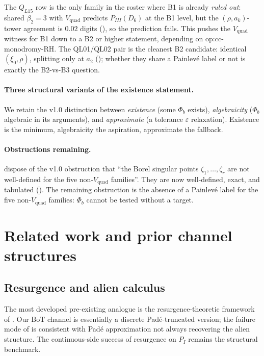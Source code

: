 \documentclass[11pt,reqno]{amsart}
\theoremstyle{plain}
\theoremstyle{definition}
\theoremstyle{remark}
\newcommand{\BoT}{\mathrm{BoT}}
\newcommand{\Vquad}{V_{\mathrm{quad}}}
\begin{document}
The $Q_{L15}$ row is the only family in the roster where B1
is already \emph{ruled out}: shared $\beta_2 = 3$ with
$\Vquad$ predicts $P_{III}(D_6)$ at the B1 level, but the
$(\rho, a_k)$-tower agreement is $0.02$ digits
(), so the prediction fails. This
pushes the $\Vquad$ witness for B1 down to a B2 or higher
statement, depending on \textsf{op:cc-monodromy-RH}. The
QL01/QL02 pair is the cleanest B2 candidate: identical
$(\xi_0, \rho)$, splitting only at $a_2$
(); whether they share a Painlev\'e label
or not is exactly the B2-vs-B3 question.

\paragraph{Three structural variants of the existence statement.}
We retain the v1.0 distinction between
\emph{existence} (some $\Phi_b$ exists),
\emph{algebraicity} ($\Phi_b$ algebraic in its arguments),
and \emph{approximate} (a tolerance $\varepsilon$ relaxation).
Existence is the minimum, algebraicity the aspiration,
approximate the fallback.

\paragraph{Obstructions remaining.}
 dispose of the v1.0
obstruction that ``the Borel singular points $\zeta_1, \ldots,
\zeta_r$ are not well-defined for the five non-$\Vquad$
families''. They are now well-defined, exact, and tabulated
(). The remaining obstruction is the
absence of a Painlev\'e label for the five non-$\Vquad$
families: $\Phi_b$ cannot be tested without a target.

\section{Related work and prior channel structures}
\label{sec:related}

\subsection{Resurgence and alien calculus}
The most developed pre-existing analogue is the
resurgence-theoretic framework of
\cite{ecalle1981fonctions, costin2008asymptotics,
sauzin2014resurgent, mitschi2016divergent}. Our $\BoT$
channel is essentially a discrete Pad\'e-truncated version;
the failure mode of \cite{siarc_borel_5x} is consistent with
Pad\'e approximation not always recovering the alien
structure. The continuous-side success of resurgence
\cite{delabaere2016divergent} on $P_I$ remains the structural
benchmark.
\end{document}

